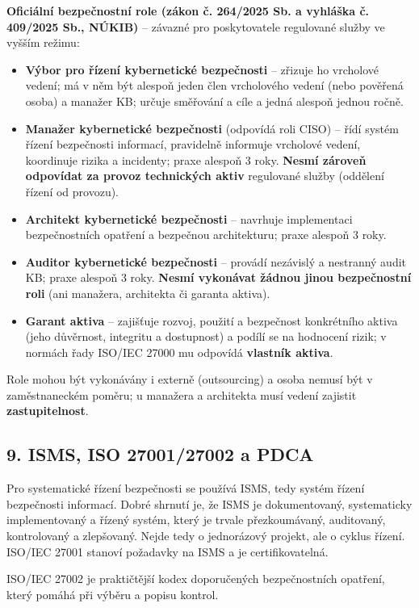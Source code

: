 \documentclass[11pt,a4paper]{article}
\begin{document}
\begin{notebox}
\textbf{Oficiální bezpečnostní role (zákon č. 264/2025 Sb. a vyhláška č. 409/2025 Sb., NÚKIB)} -- závazné pro poskytovatele regulované služby ve vyšším režimu:
\begin{itemize}
  \item \textbf{Výbor pro řízení kybernetické bezpečnosti} -- zřizuje ho vrcholové vedení; má v něm být alespoň jeden člen vrcholového vedení (nebo pověřená osoba) a manažer KB; určuje směřování a cíle a jedná alespoň jednou ročně.
  \item \textbf{Manažer kybernetické bezpečnosti} (odpovídá roli CISO) -- řídí systém řízení bezpečnosti informací, pravidelně informuje vrcholové vedení, koordinuje rizika a incidenty; praxe alespoň 3 roky. \textbf{Nesmí zároveň odpovídat za provoz technických aktiv} regulované služby (oddělení řízení od provozu).
  \item \textbf{Architekt kybernetické bezpečnosti} -- navrhuje implementaci bezpečnostních opatření a bezpečnou architekturu; praxe alespoň 3 roky.
  \item \textbf{Auditor kybernetické bezpečnosti} -- provádí nezávislý a nestranný audit KB; praxe alespoň 3 roky. \textbf{Nesmí vykonávat žádnou jinou bezpečnostní roli} (ani manažera, architekta či garanta aktiva).
  \item \textbf{Garant aktiva} -- zajišťuje rozvoj, použití a bezpečnost konkrétního aktiva (jeho důvěrnost, integritu a dostupnost) a podílí se na hodnocení rizik; v normách řady ISO/IEC 27000 mu odpovídá \textbf{vlastník aktiva}.
\end{itemize}
Role mohou být vykonávány i externě (outsourcing) a osoba nemusí být v zaměstnaneckém poměru; u manažera a architekta musí vedení zajistit \textbf{zastupitelnost}.
\end{notebox}

\subsection*{9. ISMS, ISO 27001/27002 a PDCA}

Pro systematické řízení bezpečnosti se používá ISMS, tedy systém řízení bezpečnosti informací. Dobré shrnutí je, že ISMS je dokumentovaný, systematicky implementovaný a řízený systém, který je trvale přezkoumávaný, auditovaný, kontrolovaný a zlepšovaný. Nejde tedy o jednorázový projekt, ale o cyklus řízení. ISO/IEC 27001 stanoví požadavky na ISMS a je certifikovatelná.

ISO/IEC 27002 je praktičtější kodex doporučených bezpečnostních opatření, který pomáhá při výběru a popisu kontrol.
\end{document}
